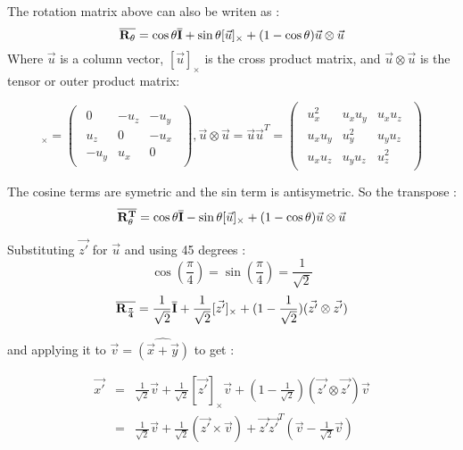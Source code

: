 \documentclass{article}
\def\matrix#1{\overline{\bf{#1}}}
\begin{document}
The rotation matrix above can also be writen as :
\begin{equation}
\matrix{R_\theta} = \cos\theta \matrix{I} + \sin\theta [\vec{u}]_{\times} + (1 - \cos\theta)\vec{u}\otimes\vec{u}
\end{equation}
Where $\vec{u}$ is a column vector, $[\vec{u}]_{\times}$ is the cross product matrix, and $\vec{u}\otimes\vec{u}$ is the tensor or outer product matrix:

\begin{equation}
[\vec{u}]_{\times} = 
\begin{pmatrix}
\begin{smallmatrix}
0 & -u_z & -u_y \\
u_z & 0 & -u_x \\
-u_y & u_x & 0
\end{smallmatrix}
\end{pmatrix}
,
\vec{u}\otimes\vec{u} =
\vec{u} \vec{u}^T =
\begin{pmatrix}
\begin{smallmatrix}
u_x^2 & u_x u_y & u_x u_z \\
u_x u_y & u_y^2 & u_y u_z \\
u_x u_z & u_y u_z & u_z ^2 
\end{smallmatrix}
\end{pmatrix}
\end{equation}

The cosine terms are symetric and the sin term is antisymetric. So the transpose :
\begin{equation}
\matrix{R_\theta^T} = \cos\theta \matrix{I} - \sin\theta [\vec{u}]_{\times} + (1 - \cos\theta)\vec{u}\otimes\vec{u}
\end{equation}

Substituting  $\vec{z'}$ for $\vec{u}$ and using 45 degrees :
\begin{equation}
\cos(\frac{\pi}{4})=\sin(\frac{\pi}{4})=\frac{1}{\sqrt{2}}
\end{equation}
\begin{equation}
\matrix{R_{\frac{\pi}{4}}} = \frac{1}{\sqrt{2}} \matrix{I} + \frac{1}{\sqrt{2}} [\vec{z'}]_{\times} + (1 - \frac{1}{\sqrt{2}})(\vec{z'}\otimes\vec{z'})
\end{equation}

and applying it to $\vec{v} = \widehat{\left( \vec{x} + \vec{y} \right) } $ to get :

\begin{eqnarray}
\vec{x'} &=& \frac{1}{\sqrt{2}} \vec{v} + \frac{1}{\sqrt{2}} [\vec{z'}]_{\times}\vec{v} + (1 - \frac{1}{\sqrt{2}})(\vec{z'}\otimes\vec{z'})\vec{v} \\
         &=& \frac{1}{\sqrt{2}} \vec{v} + \frac{1}{\sqrt{2}} (\vec{z'}\times\vec{v}) + \vec{z'} \vec{z'}^T (\vec{v} - \frac{1}{\sqrt{2}}\vec{v})
\end{eqnarray}
\end{document}
